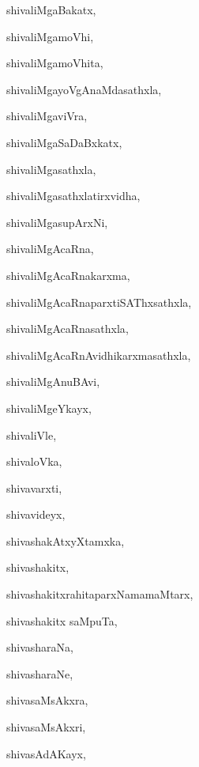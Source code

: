 \begin{multicols}{2}
{shivaliMgaBakatx}, \pageref{shivaliMgaBakatx}

{shivaliMgamoVhi}, \pageref{shivaliMgamoVhi}

{shivaliMgamoVhita}, \pageref{shivaliMgamoVhita}

{shivaliMgayoVgAnaMdasathxla}, \pageref{shivaliMgayoVgAnaMdasathxla}

{shivaliMgaviVra}, \pageref{shivaliMgaviVra}

{shivaliMgaSaDaBxkatx}, \pageref{shivaliMgaSaDaBxkatx}

{shivaliMgasathxla}, \pageref{shivaliMgasathxla}

{shivaliMgasathxlatirxvidha}, \pageref{shivaliMgasathxlatirxvidha}

{shivaliMgasupArxNi}, \pageref{shivaliMgasupArxNi}

{shivaliMgAcaRna}, \pageref{shivaliMgAcaRna}

{shivaliMgAcaRnakarxma}, \pageref{shivaliMgAcaRnakarxma}

{shivaliMgAcaRnaparxtiSAThxsathxla}, \pageref{shivaliMgAcaRnaparxtiSAThxsathxla}

{shivaliMgAcaRnasathxla}, \pageref{shivaliMgAcaRnasathxla}

{shivaliMgAcaRnAvidhikarxmasathxla}, \pageref{shivaliMgAcaRnAvidhikarxmasathxla}

{shivaliMgAnuBAvi}, \pageref{shivaliMgAnuBAvi}

{shivaliMgeYkayx}, \pageref{shivaliMgeYkayx}

{shivaliVle}, \pageref{shivaliVle}

{shivaloVka}, \pageref{shivaloVka}

{shivavarxti}, \pageref{shivavarxti}

{shivavideyx}, \pageref{shivavideyx}

{shivashakAtxyXtamxka}, \pageref{shivashakAtxyXtamxka}

{shivashakitx}, \pageref{shivashakitx}

{shivashakitxrahitaparxNamamaMtarx}, \pageref{shivashakitxrahitaparxNamamaMtarx}

{shivashakitx saMpuTa}, \pageref{shivashakitxsaMpuTa}

{shivasharaNa}, \pageref{shivasharaNa}

{shivasharaNe}, \pageref{shivasharaNe}

{shivasaMsAkxra}, \pageref{shivasaMsAkxra}

{shivasaMsAkxri}, \pageref{shivasaMsAkxri}

{shivasAdAKayx}, \pageref{shivasAdAKayx}


\end{multicols}
